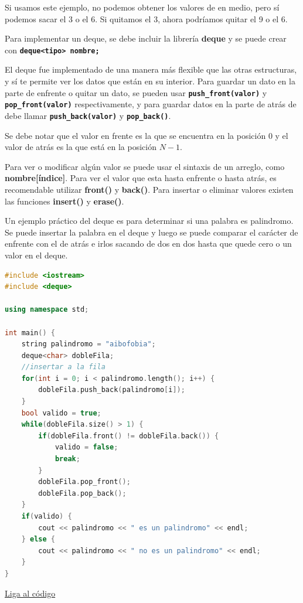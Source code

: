 \documentclass{article}
\begin{document}
Si usamos este ejemplo, no podemos obtener los valores de en medio, pero sí podemos sacar el 3 o el 6. Si quitamos el 3, ahora podríamos quitar el 9 o el 6.

Para implementar un deque, se debe incluir la librería \textbf{deque} y se puede crear con \textbf{\lstinline{deque<tipo> nombre;}}

El deque fue implementado de una manera más flexible que las otras estructuras, y sí te permite ver los datos que están en su interior. Para guardar un dato en la parte de enfrente o quitar un dato, se pueden usar \textbf{\lstinline{push_front(valor)}} y \textbf{\lstinline{pop_front(valor)}} respectivamente, y para guardar datos en la parte de atrás de debe llamar \textbf{\lstinline{push_back(valor)}} y \textbf{\lstinline{pop_back()}}.

Se debe notar que el valor en frente es la que se encuentra en la posición 0 y el valor de atrás es la que está en la posición $N - 1$.

Para ver o modificar algún valor se puede usar el sintaxis de un arreglo, como \textbf{nombre[índice]}. Para ver el valor que esta hasta enfrente o hasta atrás, es recomendable utilizar \textbf{front()} y \textbf{back()}. Para insertar o eliminar valores existen las funciones \textbf{insert()} y \textbf{erase()}.

Un ejemplo práctico del deque es para determinar si una palabra es palindromo. Se puede insertar la palabra en el deque y luego se puede comparar el carácter de enfrente con el de atrás e irlos sacando de dos en dos hasta que quede cero o un valor en el deque.

\begin{lstlisting}[language=C++, caption=Deques]
#include <iostream>
#include <deque>

using namespace std;

int main() {
    string palindromo = "aibofobia";
    deque<char> dobleFila;
    //insertar a la fila
    for(int i = 0; i < palindromo.length(); i++) {
        dobleFila.push_back(palindromo[i]);
    }
    bool valido = true;
    while(dobleFila.size() > 1) {
        if(dobleFila.front() != dobleFila.back()) {
            valido = false;
            break;
        }
        dobleFila.pop_front();
        dobleFila.pop_back();
    }
    if(valido) {
        cout << palindromo << " es un palindromo" << endl;
    } else {
        cout << palindromo << " no es un palindromo" << endl;
    }
}
\end{lstlisting}
\href{https://repl.it/@Jamesscn/Deque}{Liga al código}
\end{document}
